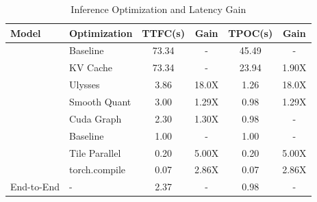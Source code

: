 
\begin{table}[h]
    \centering

    \begin{tabular}{l|l|c|c|c|c}
        \toprule
        \textbf{Model} & \textbf{Optimization} & \textbf{TTFC(s)} & \textbf{Gain} & \textbf{TPOC(s)} & \textbf{Gain} \\
        \midrule
            & Baseline     & 73.34 & -      & 45.49 & -      \\
            & KV Cache     & 73.34 & -      & 23.94 & 1.90X  \\
            & Ulysses      & 3.86  & 18.0X  & 1.26  & 18.0X  \\
            & Smooth Quant & 3.00  & 1.29X  & 0.98  & 1.29X  \\
            & Cuda Graph   & 2.30  & 1.30X  & 0.98  & -      \\
        \midrule
            & Baseline      & 1.00  & -     & 1.00  & -     \\
            & Tile Parallel & 0.20  & 5.00X & 0.20  & 5.00X \\
            & torch.compile & 0.07  & 2.86X & 0.07  & 2.86X \\
        \midrule
        End-to-End & - & 2.37 & - & 0.98 & - \\
        \bottomrule
    \end{tabular}
    \caption{Inference Optimization and Latency Gain}
    \label{tab:opt_and_gain}
\end{table}
